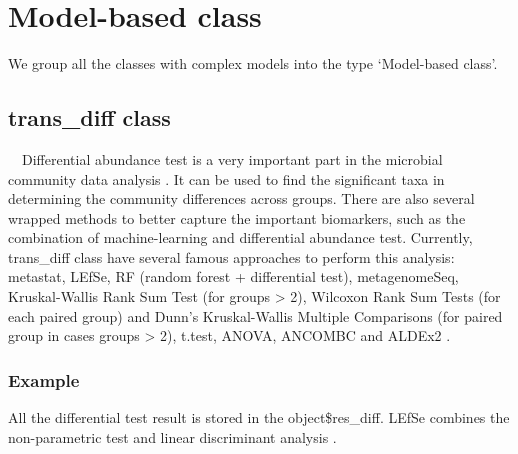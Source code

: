 \documentclass[
]{book}
\begin{document}
\hypertarget{model-based-class}{%
\chapter{Model-based class}\label{model-based-class}}

We group all the classes with complex models into the type `Model-based class'.

\hypertarget{trans_diff-class}{%
\section{trans\_diff class}\label{trans_diff-class}}

　Differential abundance test is a very important part in the microbial community data analysis \citep{Nearing_Microbiome_2022}.
It can be used to find the significant taxa in determining the community differences across groups.
There are also several wrapped methods to better capture the important biomarkers,
such as the combination of machine-learning and differential abundance test.
Currently, trans\_diff class have several famous approaches to perform this analysis:
metastat\citep{White_Statistical_2009}, LEfSe\citep{Segata_Metagenomic_2011}, RF (random forest + differential test), metagenomeSeq\citep{Paulson_Differential_2013},
Kruskal-Wallis Rank Sum Test (for groups \textgreater{} 2), Wilcoxon Rank Sum Tests (for each paired group) and
Dunn's Kruskal-Wallis Multiple Comparisons (for paired group in cases groups \textgreater{} 2),
t.test, ANOVA, ANCOMBC \citep{Lin_Analysis_2020} and ALDEx2 \citep{Fernandes_Unifying_2014}.

\hypertarget{example-4}{%
\subsection{Example}\label{example-4}}

All the differential test result is stored in the object\$res\_diff.
LEfSe combines the non-parametric test and linear discriminant analysis \citep{Segata_Metagenomic_2011}.
\end{document}
